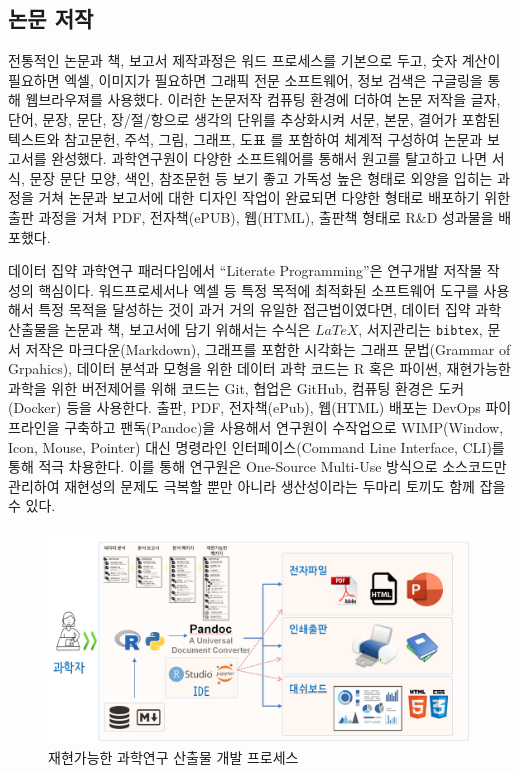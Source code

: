\documentclass[smallextended]{svjour3}       %
\begin{document}
\hypertarget{uxb17cuxbb38-uxc800uxc791}{%
\subsection{논문 저작}\label{uxb17cuxbb38-uxc800uxc791}}

전통적인 논문과 책, 보고서 제작과정은 워드 프로세스를 기본으로 두고,
숫자 계산이 필요하면 엑셀, 이미지가 필요하면 그래픽 전문 소프트웨어,
정보 검색은 구글링을 통해 웹브라우져를 사용했다. 이러한 논문저작 컴퓨팅
환경에 더하여 논문 저작을 글자, 단어, 문장, 문단, 장/절/항으로 생각의
단위를 추상화시켜 서문, 본문, 결어가 포함된 텍스트와 참고문헌, 주석,
그림, 그래프, 도표 를 포함하여 체계적 구성하여 논문과 보고서를 완성했다.
과학연구원이 다양한 소프트웨어를 통해서 원고를 탈고하고 나면 서식, 문장
문단 모양, 색인, 참조문헌 등 보기 좋고 가독성 높은 형태로 외양을 입히는
과정을 거쳐 논문과 보고서에 대한 디자인 작업이 완료되면 다양한 형태로
배포하기 위한 출판 과정을 거쳐 PDF, 전자책(ePUB), 웹(HTML), 출판책
형태로 R\&D 성과물을 배포했다.

데이터 집약 과학연구 패러다임에서 ``Literate Programming''은 연구개발
저작물 작성의 핵심이다. 워드프로세서나 엑셀 등 특정 목적에 최적화된
소프트웨어 도구를 사용해서 특정 목적을 달성하는 것이 과거 거의 유일한
접근법이였다면, 데이터 집약 과학 산출물을 논문과 책, 보고서에 담기
위해서는 수식은 \(LaTeX\), 서지관리는 \texttt{bibtex}, 문서 저작은
마크다운(Markdown), 그래프를 포함한 시각화는 그래프 문법(Grammar of
Grpahics), 데이터 분석과 모형을 위한 데이터 과학 코드는 R 혹은 파이썬,
재현가능한 과학을 위한 버전제어를 위해 코드는 Git, 협업은 GitHub, 컴퓨팅
환경은 도커(Docker) 등을 사용한다. 출판, PDF, 전자책(ePub), 웹(HTML)
배포는 DevOps 파이프라인을 구축하고 팬독(Pandoc)을 사용해서 연구원이
수작업으로 WIMP(Window, Icon, Mouse, Pointer) 대신 명령라인
인터페이스(Command Line Interface, CLI)를 통해 적극 차용한다. 이를 통해
연구원은 One-Source Multi-Use 방식으로 소스코드만 관리하여 재현성의
문제도 극복할 뿐만 아니라 생산성이라는 두마리 토끼도 함께 잡을 수 있다.

\begin{figure}

{\centering \includegraphics[width=1\linewidth]{fig/koita-writing} 

}

\caption{재현가능한 과학연구 산출물 개발 프로세스}\label{fig:paradigm-tidyverse-writing}
\end{figure}
\end{document}
